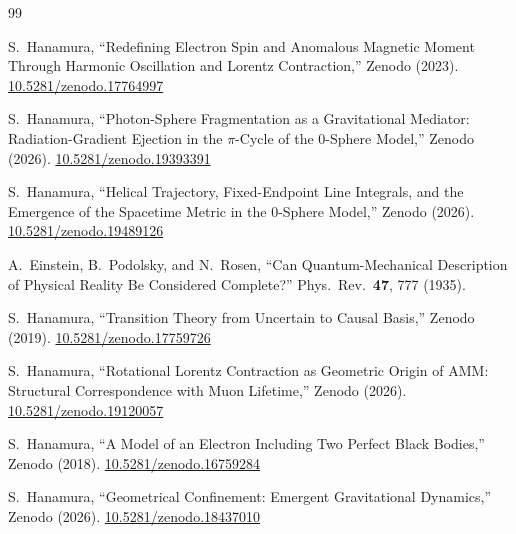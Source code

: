 \documentclass[%
 reprint, amsmath,amssymb, aps, prb, ]{revtex4-2}
\numberwithin{equation}{section}
\begin{document}
\begin{thebibliography}{99}

 S.~Hanamura, ``Redefining Electron Spin and Anomalous Magnetic Moment Through Harmonic Oscillation and Lorentz Contraction,'' Zenodo (2023). \href{https://doi.org/10.5281/zenodo.17764997}{10.5281/zenodo.17764997}

 S.~Hanamura, ``Photon-Sphere Fragmentation as a Gravitational Mediator: Radiation-Gradient Ejection in the $\pi$-Cycle of the 0-Sphere Model,'' Zenodo (2026). \href{https://doi.org/10.5281/zenodo.19393391}{10.5281/zenodo.19393391}

 S.~Hanamura, ``Helical Trajectory, Fixed-Endpoint Line Integrals, and the Emergence of the Spacetime Metric in the 0-Sphere Model,'' Zenodo (2026). \href{https://doi.org/10.5281/zenodo.19489126}{10.5281/zenodo.19489126}

 A.~Einstein, B.~Podolsky, and N.~Rosen, ``Can Quantum-Mechanical Description of Physical Reality Be Considered Complete?'' Phys.\ Rev.\ \textbf{47}, 777 (1935).

 S.~Hanamura, ``Transition Theory from Uncertain to Causal Basis,'' Zenodo (2019). \href{https://doi.org/10.5281/zenodo.17759726}{10.5281/zenodo.17759726}

 S.~Hanamura, ``Rotational Lorentz Contraction as Geometric Origin of AMM: Structural Correspondence with Muon Lifetime,'' Zenodo (2026). \href{https://doi.org/10.5281/zenodo.19120057}{10.5281/zenodo.19120057}

 S.~Hanamura, ``A Model of an Electron Including Two Perfect Black Bodies,'' Zenodo (2018). \href{https://doi.org/10.5281/zenodo.16759284}{10.5281/zenodo.16759284}

 S.~Hanamura, ``Geometrical Confinement: Emergent Gravitational Dynamics,'' Zenodo (2026). \href{https://doi.org/10.5281/zenodo.18437010}{10.5281/zenodo.18437010}


\end{thebibliography}
\end{document}
